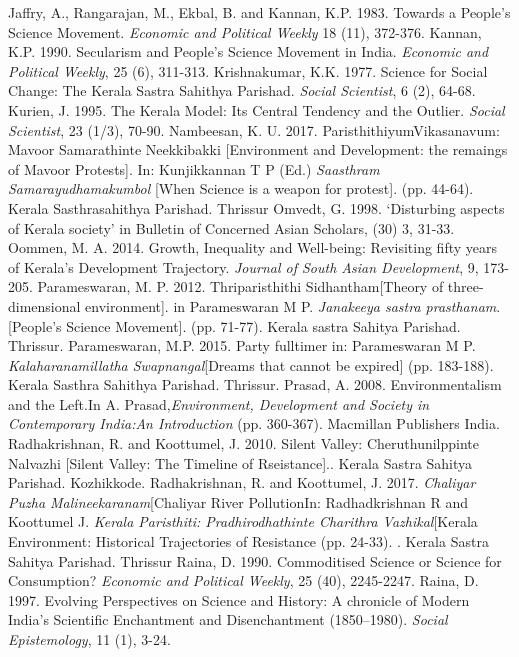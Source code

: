 \documentclass[twoside, 13pt]{article}
\begin{document}
{{{{{\begin{thebibliography}{99}
\bibitem{} Jaffry, A., Rangarajan, M., Ekbal, B. and Kannan, K.P. 1983. Towards a People's Science Movement. \textit{Economic and Political Weekly} 18 (11), 372-376.
\bibitem{} Kannan, K.P. 1990. Secularism and People's Science Movement in India. \textit{Economic and Political Weekly}, 25 (6), 311-313.
\bibitem{} Krishnakumar, K.K. 1977. Science for Social Change: The Kerala Sastra Sahithya Parishad. \textit{Social Scientist}, 6 (2), 64-68.
\bibitem{} Kurien, J. 1995. The Kerala Model: Its Central Tendency and the Outlier. \textit{Social Scientist}, 23 (1/3), 70-90.
\bibitem{} Nambeesan, K. U. 2017. ParisthithiyumVikasanavum: Mavoor Samarathinte Neekkibakki [Environment and Development: the remaings of Mavoor Protests]. In: Kunjikkannan T P (Ed.) \textit{Saasthram Samarayudhamakumbol} [When Science is a weapon for protest]. (pp. 44-64). Kerala Sasthrasahithya Parishad. Thrissur
\bibitem{} Omvedt, G. 1998. ‘Disturbing aspects of Kerala society’ in Bulletin of Concerned Asian Scholars, (30) 3, 31-33.
\bibitem{} Oommen, M. A. 2014. Growth, Inequality and Well-being: Revisiting fifty years of Kerala’s Development Trajectory. \textit{Journal of South Asian Development}, 9, 173-205.
\bibitem{} Parameswaran, M. P. 2012. Thriparisthithi Sidhantham[Theory of three-dimensional environment]. in Parameswaran M P. \textit{Janakeeya sastra prasthanam}. [People’s Science Movement]. (pp. 71-77). Kerala sastra Sahitya Parishad. Thrissur.
\bibitem{} Parameswaran, M.P. 2015. Party fulltimer in: Parameswaran M P. \textit{Kalaharanamillatha Swapnangal}[Dreams that cannot be expired] (pp. 183-188). Kerala Sasthra Sahithya Parishad. Thrissur.
\bibitem{} Prasad, A. 2008. Environmentalism and the Left.In A. Prasad,\textit{Environment, Development and Society in Contemporary India:An Introduction }(pp. 360-367). Macmillan Publishers India.
\bibitem{}  Radhakrishnan, R. and Koottumel, J. 2010. Silent Valley: Cheruthunilppinte Nalvazhi [Silent Valley: The Timeline of Rseistance].. Kerala Sastra Sahitya Parishad. Kozhikkode.
\bibitem{} Radhakrishnan, R. and Koottumel, J. 2017. \textit{Chaliyar Puzha Malineekaranam}[Chaliyar River PollutionIn: Radhadkrishnan R and Koottumel J. \textit{Kerala Paristhiti: Pradhirodhathinte Charithra Vazhikal}[Kerala Environment: Historical Trajectories of Resistance (pp. 24-33). . Kerala Sastra Sahitya Parishad. Thrissur
\bibitem{} Raina, D. 1990. Commoditised Science or Science for Consumption? \textit{Economic and Political Weekly}, 25 (40), 2245-2247.
\bibitem{} Raina, D. 1997. Evolving Perspectives on Science and History: A chronicle of Modern India's Scientific Enchantment and Disenchantment (1850–1980). \textit{Social Epistemology}, 11 (1), 3-24.

\end{thebibliography}}}}}}
\end{document}
